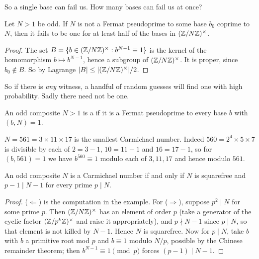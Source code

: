 \documentclass[a4paper]{scrartcl}
\begin{document}
So a single base can fail us. How many bases can fail us at once?

\begin{proposition}\label{prop:halfbases}
	Let $N > 1$ be odd. If $N$ is not a Fermat pseudoprime to some base $b_0$ coprime to $N$, then it fails to be one for at least half of the bases in $(\mathbb{Z}/N\mathbb{Z})^\times$.
\end{proposition}
\begin{proof}
	The set $B = \{b \in (\mathbb{Z}/N\mathbb{Z})^\times : b^{N-1} \equiv 1\}$ is the kernel of the homomorphism $b \mapsto b^{N-1}$, hence a subgroup of $(\mathbb{Z}/N\mathbb{Z})^\times$. It is proper, since $b_0 \notin B$. So by Lagrange $|B| \leq |(\mathbb{Z}/N\mathbb{Z})^\times|/2$.
\end{proof}

So if there is \emph{any} witness, a handful of random guesses will find one with high probability. Sadly there need not be one.

\begin{definition}
	An odd composite $N > 1$ is a  if it is a Fermat pseudoprime to every base $b$ with $(b,N) = 1$.
\end{definition}

\begin{example}
	$N = 561 = 3\times11\times17$ is the smallest Carmichael number. Indeed $560 = 2^4\times5\times7$ is divisible by each of $2 = 3-1$, $10 = 11-1$ and $16 = 17-1$, so for $(b, 561) = 1$ we have $b^{560}\equiv1$ modulo each of $3, 11, 17$ and hence modulo $561$.
\end{example}

\begin{proposition}
	An odd composite $N$ is a Carmichael number if and only if $N$ is squarefree and $p - 1 \mid N - 1$ for every prime $p \mid N$.
\end{proposition}
\begin{proof}
	($\Leftarrow$) is the computation in the example. For ($\Rightarrow$), suppose $p^2 \mid N$ for some prime $p$. Then $(\mathbb{Z}/N\mathbb{Z})^\times$ has an element of order $p$ (take a generator of the cyclic factor $(\mathbb{Z}/p^k\mathbb{Z})^\times$ and raise it appropriately), and $p \nmid N - 1$ since $p \mid N$, so that element is not killed by $N - 1$. Hence $N$ is squarefree. Now for $p \mid N$, take $b$ with $b$ a primitive root mod $p$ and $b \equiv 1$ modulo $N/p$, possible by the Chinese remainder theorem; then $b^{N-1}\equiv1 \pmod p$ forces $(p-1) \mid N - 1$.
\end{proof}
\end{document}
